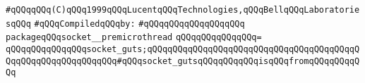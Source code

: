 \label{src/lib/std/socket--premicrothread.pkg}
\verb|#qQQqqQQq(C)qQQq1999qQQqLucentqQQqTechnologies,qQQqBellqQQqLaboratoriesqQQq|\newline
\newline
\verb|#qQQqCompiledqQQqby:|\newline
\verb|#qQQqqQQqqQQqqQQqqQQq|\newline
\newline
\verb|packageqQQqsocket__premicrothread|\newline
\verb|qQQqqQQqqQQqqQQq=|\newline
\verb|qQQqqQQqqQQqqQQqsocket_guts;qQQqqQQqqQQqqQQqqQQqqQQqqQQqqQQqqQQqqQQqqQQqqQQqqQQqqQQqqQQqqQQq#qQQqsocket_gutsqQQqqQQqqQQqisqQQqfromqQQqqQQqqQQq|\newline
\newline

